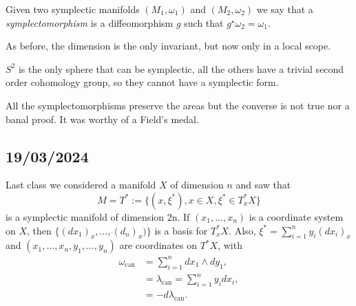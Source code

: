 \documentclass[misc]{subfiles}
\begin{document}
\begin{Dfn}
    Given two symplectic manifolds $(M_1,\omega_1)$ and $(M_2,\omega_2)$ we say that a \emph{symplectomorphism} is a diffeomorphism $g$ such that $g^\star\omega_2=\omega_1$.

    As before, the dimension is the only invariant, but now only in a local scope.
\end{Dfn}


\begin{Prp}
    $S^2$ is the only sphere that can be symplectic, all the others have a trivial second order cohomology group, so they cannot have a symplectic form.
\end{Prp}

\begin{Prp}
    All the symplectomorphisms preserve the areas but the converse is not true nor a banal proof. It was worthy of a Field's medal.
\end{Prp}

\subsection*{19/03/2024}

Last class we considered a manifold $X$ of dimension $n$ and saw that
\[
M=T^\ast:=\{(x,\xi^\ast), x\in X, \xi^\ast\in T_x^\ast X\}
\] 
is a symplectic manifold of dimension 2n. If $(x_1,\dots,x_n)$ is a coordinate system on $X$, then $\{(dx_1)_x,\dots,(d_n)_x)\}$ is a basis for $T_x^\ast X$. Also, $\xi^\ast=\sum_{i=1}^n y_i(dx_i)_x$ and $(x_1,\dots,x_n,y_1,\dots,y_n)$ are coordinates on $T^\ast X$, with
\begin{align*}
    \omega_\text{can} &= \sum_{i=1}^n dx_1\wedge dy_1, \\
                      &= \lambda_\text{can} = \sum_{i=1}^n y_i dx_i, \\
                      &= -d\lambda_\text{can}.
\end{align*}

\end{document}
